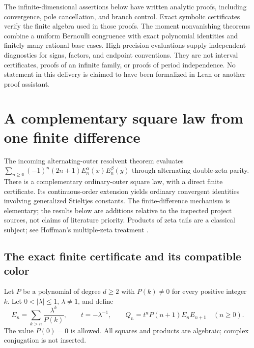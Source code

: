 \documentclass[11pt,a4paper]{article}
\numberwithin{equation}{section}
\theoremstyle{definition}
\theoremstyle{remark}
\begin{document}
The infinite-dimensional assertions below have written analytic proofs,
including convergence, pole cancellation, and branch control. Exact
symbolic certificates verify the finite algebra used in those proofs.
The moment nonvanishing theorems combine a uniform Bernoulli congruence
with exact polynomial identities and finitely many rational base cases.
High-precision evaluations supply independent diagnostics for signs,
factors, and endpoint conventions. They are not interval certificates,
proofs of an infinite family, or proofs of period independence.
No statement in this delivery is claimed to have been formalized in
Lean or another proof assistant.




\section{A complementary square law from one finite difference}
\label{ats:section}

The incoming alternating-outer resolvent theorem \cite{HTST} evaluates
$\sum_{n\ge0}(-1)^n(2n+1)E_n^\alpha(x)E_n^\beta(y)$ through
alternating double-zeta parity.  There is a complementary ordinary-outer
square law, with a direct finite certificate.  Its continuous-order
extension yields ordinary convergent identities involving generalized
Stieltjes constants.  The finite-difference mechanism is elementary;
the results below are additions relative to the inspected project
sources, not claims of literature priority.  Products of zeta tails are
a classical subject; see Hoffman's multiple-zeta treatment \cite{Hoffman}.

\subsection{The exact finite certificate and its compatible color}

Let $P$ be a polynomial of degree $d\ge2$ with $P(k)\ne0$ for every
positive integer $k$. Let $0<|\lambda|\le1$, $\lambda\ne1$, and define
\[
 E_n=\sum_{k>n}\frac{\lambda^k}{P(k)},\qquad
 t=-\lambda^{-1},\qquad
 Q_n=t^nP(n+1)E_nE_{n+1}\quad(n\ge0).
\]
The value $P(0)=0$ is allowed. All squares and products are algebraic;
complex conjugation is not inserted.
\end{document}
